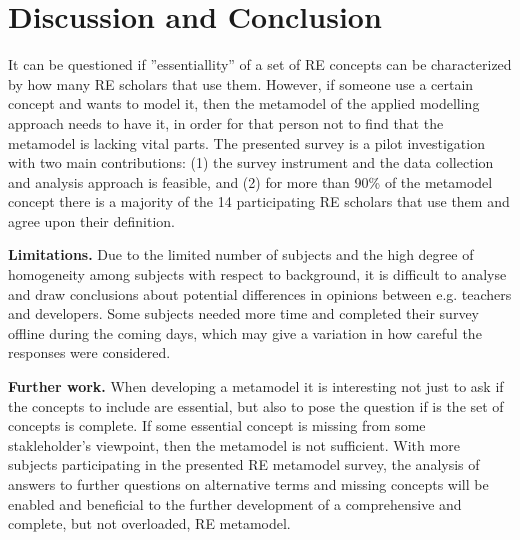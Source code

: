 \documentclass[a4paper]{llncs}
\begin{document}



\section{Discussion and Conclusion}\label{section:discussion}

It can be questioned if ''essentiallity'' of a set of RE concepts can be characterized by how many RE scholars that use them. However, if someone use a certain concept and wants to model it, then the metamodel of the applied modelling approach needs to have it, in order for that person not to find that the metamodel is lacking vital parts. The presented survey is a pilot investigation with two main contributions: (1) the survey instrument and the data collection and analysis approach is feasible, and (2) for more than 90\% of the metamodel concept there is a majority of the 14 participating RE scholars that use them and agree upon their definition. 




{\bf Limitations. } Due to the limited number of subjects and the high degree of homogeneity among subjects with respect to background, it is difficult to analyse and draw conclusions about potential differences in opinions between e.g. teachers and developers. Some subjects needed more time and completed their survey offline during the coming days, which may give a variation in how careful the responses were considered. 
 
{\bf Further work.} When developing a metamodel it is interesting not just to ask if the concepts to include are essential, but also to pose the question if is the set of concepts is complete. If some essential concept is missing from some stakleholder's viewpoint, then the metamodel is not sufficient.  With more subjects participating in the presented RE metamodel survey, the analysis of answers to further questions on alternative terms and missing concepts will be enabled and beneficial to the further development of a comprehensive and complete, but not overloaded, RE metamodel. %
\end{document}

